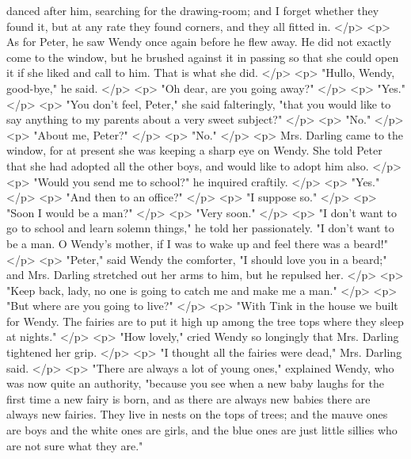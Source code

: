       danced after him, searching for the drawing-room; and I forget whether
      they found it, but at any rate they found corners, and they all fitted in.
    </p>
    <p>
      As for Peter, he saw Wendy once again before he flew away. He did not
      exactly come to the window, but he brushed against it in passing so that
      she could open it if she liked and call to him. That is what she did.
    </p>
    <p>
      "Hullo, Wendy, good-bye," he said.
    </p>
    <p>
      "Oh dear, are you going away?"
    </p>
    <p>
      "Yes."
    </p>
    <p>
      "You don't feel, Peter," she said falteringly, "that you would like to say
      anything to my parents about a very sweet subject?"
    </p>
    <p>
      "No."
    </p>
    <p>
      "About me, Peter?"
    </p>
    <p>
      "No."
    </p>
    <p>
      Mrs. Darling came to the window, for at present she was keeping a sharp
      eye on Wendy. She told Peter that she had adopted all the other boys, and
      would like to adopt him also.
    </p>
    <p>
      "Would you send me to school?" he inquired craftily.
    </p>
    <p>
      "Yes."
    </p>
    <p>
      "And then to an office?"
    </p>
    <p>
      "I suppose so."
    </p>
    <p>
      "Soon I would be a man?"
    </p>
    <p>
      "Very soon."
    </p>
    <p>
      "I don't want to go to school and learn solemn things," he told her
      passionately. "I don't want to be a man. O Wendy's mother, if I was to
      wake up and feel there was a beard!"
    </p>
    <p>
      "Peter," said Wendy the comforter, "I should love you in a beard;" and
      Mrs. Darling stretched out her arms to him, but he repulsed her.
    </p>
    <p>
      "Keep back, lady, no one is going to catch me and make me a man."
    </p>
    <p>
      "But where are you going to live?"
    </p>
    <p>
      "With Tink in the house we built for Wendy. The fairies are to put it high
      up among the tree tops where they sleep at nights."
    </p>
    <p>
      "How lovely," cried Wendy so longingly that Mrs. Darling tightened her
      grip.
    </p>
    <p>
      "I thought all the fairies were dead," Mrs. Darling said.
    </p>
    <p>
      "There are always a lot of young ones," explained Wendy, who was now quite
      an authority, "because you see when a new baby laughs for the first time a
      new fairy is born, and as there are always new babies there are always new
      fairies. They live in nests on the tops of trees; and the mauve ones are
      boys and the white ones are girls, and the blue ones are just little
      sillies who are not sure what they are."

